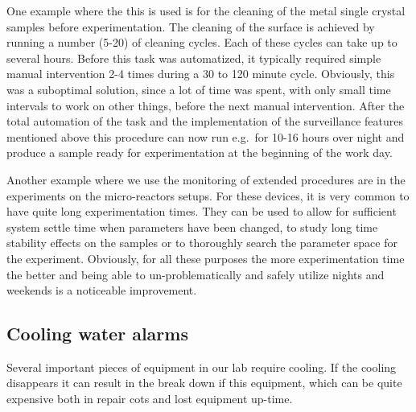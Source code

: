 One example where the this is used is for the cleaning of the metal
single crystal samples before experimentation. The cleaning of the
surface is achieved by running a number (5-20) of cleaning
cycles. Each of these cycles can take up to several hours. Before this
task was automatized, it typically required simple manual intervention
2-4 times during a 30 to 120 minute cycle. Obviously, this was a
suboptimal solution, since a lot of time was spent, with only small
time intervals to work on other things, before the next manual
intervention. After the total automation of the task and the
implementation of the surveillance features mentioned above this
procedure can now run e.g.\ for 10-16 hours over night and produce a
sample ready for experimentation at the beginning of the work day.

Another example where we use the monitoring of extended procedures are
in the experiments on the micro-reactors
setups. For these devices, it is very common to have quite long
experimentation times. They can be used to allow for sufficient system
settle time when parameters have been changed, to study long time
stability effects on the samples or to thoroughly search the parameter
space for the experiment. Obviously, for all these purposes the more
experimentation time the better and being able to un-problematically
and safely utilize nights and weekends is a noticeable
improvement.

\subsection{Cooling water alarms}\label{sec:cooling_water_alarms}

Several important pieces of equipment in our lab require cooling. If
the cooling disappears it can result in the break down if this
equipment, which can be quite expensive both in repair cots and lost
equipment up-time.%

